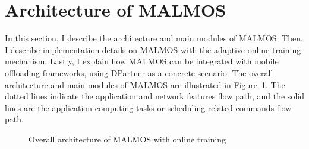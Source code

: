 \section{Architecture of MALMOS}
\label{online:architecture}
In this section, I describe the architecture and main modules of MALMOS.
%
Then, I describe implementation details on MALMOS with the adaptive
online training mechanism.
%
Lastly, I explain how MALMOS can be integrated with mobile offloading
frameworks, using DPartner as a concrete scenario.
%
The overall architecture and main modules of MALMOS are illustrated in
Figure~\ref{fig:malmos}.
%
The dotted lines indicate the application and network features flow path, and the
solid lines are the application computing tasks or scheduling-related
commands flow path.
%
\begin{figure}
\centering
{}
\caption{Overall architecture of MALMOS with online training}
\label{fig:malmos}
\end{figure}
%

